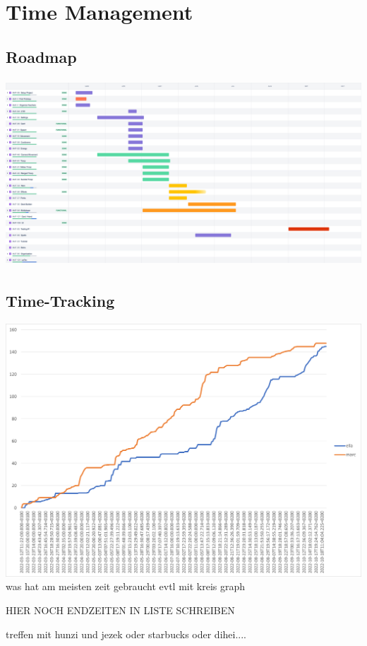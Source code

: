 \chapter{Time Management}

\section{Roadmap}
\includegraphics[height=7cm]{resources/Roadmap.png}\\

\section{Time-Tracking}
\includegraphics*[width=15cm]{resources/graph.png}\\

was hat am meisten zeit gebraucht evtl mit kreis graph

HIER NOCH ENDZEITEN IN LISTE SCHREIBEN


treffen mit hunzi und jezek oder starbucks oder dihei....

